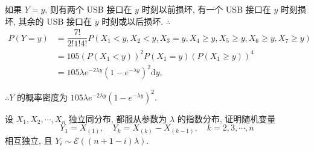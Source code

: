 \documentclass{ctexart}
\begin{document}
\begin{solution}
    如果 $Y=y$, 则有两个 USB 接口在 $y$ 时刻以前损坏, 有一个 USB 接口在 $y$ 时刻损坏, 其余的 USB 接口在 $y$ 时刻或以后损坏. $\therefore$
    \begin{align*}
        P(Y=y) & =\dfrac{7!}{2!1!4!}P(X_1<y,X_2<y,X_3=y,X_4\geq y,X_5\geq y,X_6\geq y,X_7\geq y) \\
        & =105(P(X_1<y))^2P(X_1=y)(P(X_1\geq y))^4 \\
        & =105\lambda e^{-2\lambda y}(1-e^{-\lambda y})^2\mathrm{d}y,
    \end{align*}

    $\therefore Y$ 的概率密度为 $105\lambda e^{-2\lambda y}(1-e^{-\lambda y})^2$.
\end{solution}
\addtocounter{exercise}{2}
\begin{exercise}%
    设 $X_1,X_2,\cdots,X_n$ 独立同分布, 都服从参数为 $\lambda$ 的指数分布, 证明随机变量
    \[Y_1=X_{(1)},\quad Y_k=X_{(k)}-X_{(k-1)},\quad k=2,3,\cdots,n\]
    相互独立, 且 $Y_i\sim\mathcal{E}((n+1-i)\lambda)$.
\end{exercise}
\end{document}

